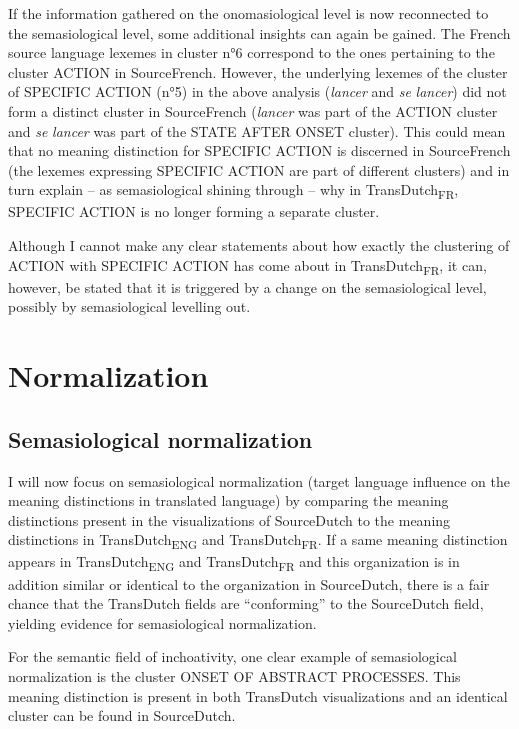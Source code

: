 If the information gathered on the onomasiological level is now reconnected to the semasiological level, some additional insights can again be gained. The French source language lexemes in cluster n°6 correspond to the ones pertaining to the cluster ACTION in SourceFrench. However, the underlying lexemes of the cluster of {SPECIFIC} ACTION (n°5) in the above analysis (\textit{lancer} and \textit{se} \textit{lancer}) did not form a distinct cluster in SourceFrench (\textit{lancer} was part of the ACTION cluster and \textit{se} \textit{lancer} was part of the STATE AFTER ONSET cluster). This could mean that no meaning distinction for {SPECIFIC} ACTION is discerned in SourceFrench (the lexemes expressing {SPECIFIC} ACTION are part of different clusters) and in turn explain – as semasiological shining through – why in TransDutch\textsubscript{FR}, {SPECIFIC} ACTION is no longer forming a separate cluster.

Although I cannot make any clear statements about how exactly the clustering of ACTION with {SPECIFIC} ACTION has come about in TransDutch\textsubscript{FR}, it can, however, be stated that it is triggered by a change on the semasiological level, possibly by semasiological levelling out.

\section{Normalization}
\label{sec:4.7}  
\subsection{Semasiological normalization}
\label{sec:4.7.1}  
I will now focus on semasiological normalization (target language influence on the meaning distinctions in translated language) by comparing the meaning distinctions present in the visualizations of SourceDutch to the meaning distinctions in TransDutch\textsubscript{ENG} and TransDutch\textsubscript{FR}. If a same meaning distinction appears in TransDutch\textsubscript{ENG} and TransDutch\textsubscript{FR} and this organization is in addition similar or identical to the organization in SourceDutch, there is a fair chance that the TransDutch fields are ``conforming'' to the SourceDutch field, yielding evidence for semasiological normalization.

For the semantic field of inchoativity, one clear example of semasiological normalization is the cluster {ONSET OF ABSTRACT PROCESSES}. This meaning distinction is present in both TransDutch visualizations and an identical cluster can be found in SourceDutch.

